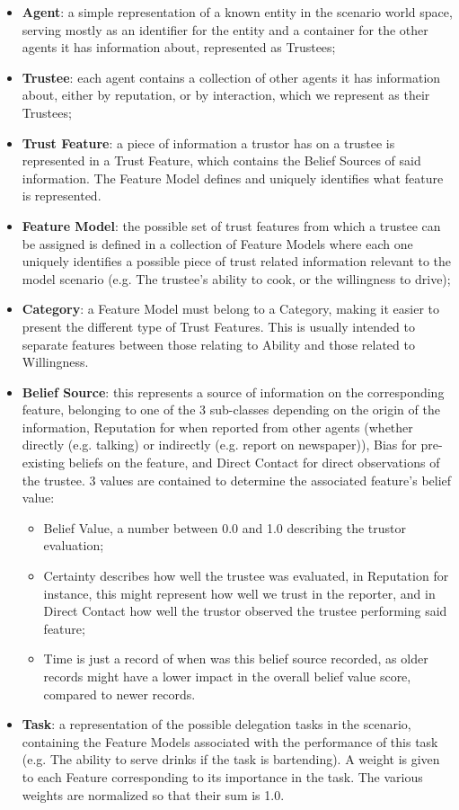 \begin{itemize}
    \item \textbf{Agent}: a simple representation of a known entity in the scenario world space, serving mostly as an identifier for the entity and a container for the other agents it has information about, represented as Trustees;
    \item \textbf{Trustee}: each agent contains a collection of other agents it has information about, either by reputation, or by interaction, which we represent as their Trustees;
    \item \textbf{Trust Feature}: a piece of information a trustor has on a trustee is represented in a Trust Feature, which contains the Belief Sources of said information. The Feature Model defines and uniquely identifies what feature is represented.
    \item \textbf{Feature Model}: the possible set of trust features from which a trustee can be assigned is defined in a collection of Feature Models where each one uniquely identifies a possible piece of trust related information relevant to the model scenario (e.g. The trustee's ability to cook, or the willingness to drive);
    \item \textbf{Category}: a Feature Model must belong to a Category, making it easier to  present the different type of Trust Features. This is usually intended to separate features between those relating to Ability and those related to Willingness.
    \item \textbf{Belief Source}: this represents a source of information on the corresponding feature, belonging to one of the 3 sub-classes depending on the origin of the information, Reputation for when reported from other agents (whether directly (e.g. talking) or indirectly (e.g. report on newspaper)), Bias for pre-existing beliefs on the feature, and Direct Contact for direct observations of the trustee. 3 values are contained to determine the associated feature's belief value: 
    \begin{itemize}
        \item Belief Value, a number between 0.0 and 1.0 describing the trustor evaluation;
        \item Certainty describes how well the trustee was evaluated, in Reputation for instance, this might represent how well we trust in the reporter, and in Direct Contact how well the trustor observed the trustee performing said feature;
        \item Time is just a record of when was this belief source recorded, as older records might have a lower impact in the overall belief value score, compared to newer records.
    \end{itemize} 
    \item \textbf{Task}: a representation of the possible delegation tasks in the scenario, containing the Feature Models associated with the performance of this task (e.g. The ability to serve drinks if the task is bartending). A weight is given to each Feature corresponding to its importance in the task. The various weights are normalized so that their sum is 1.0.
\end{itemize} 

